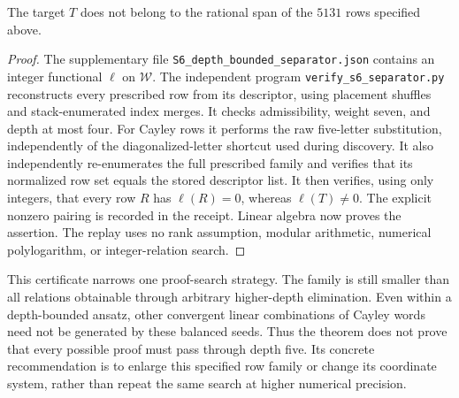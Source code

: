 \begin{theorem}
The target $T$ does not belong to the rational span of the $5131$
rows specified above.
\end{theorem}
\begin{proof}
The supplementary file \texttt{S6\_depth\_bounded\_separator.json}
contains an integer functional $\ell$ on $\mathcal W$. The independent
program \texttt{verify\_s6\_separator.py} reconstructs every prescribed
row from its descriptor, using placement shuffles and stack-enumerated
index merges. It checks admissibility, weight seven, and depth at most
four. For Cayley rows it performs the raw five-letter substitution,
independently of the diagonalized-letter shortcut used during discovery.
It also independently re-enumerates the full prescribed family and verifies
that its normalized row set equals the stored descriptor list. It then
verifies, using only integers, that every row $R$ has
$\ell(R)=0$, whereas $\ell(T)\ne0$. The explicit nonzero pairing is
recorded in the receipt. Linear algebra now proves the assertion.
The replay uses no rank assumption, modular arithmetic, numerical
polylogarithm, or integer-relation search.
\end{proof}

This certificate narrows one proof-search strategy. The family is still
smaller than all relations obtainable through arbitrary higher-depth
elimination. Even within a depth-bounded ansatz, other convergent linear
combinations of Cayley words need not be generated by these balanced
seeds. Thus the theorem does not prove that every possible proof must
pass through depth five. Its concrete recommendation is to enlarge
this specified row family or change its coordinate system, rather than
repeat the same search at higher numerical precision.
